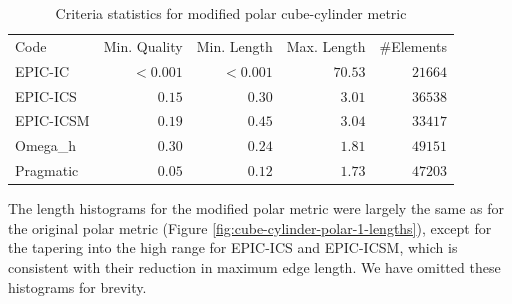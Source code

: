 \documentclass[3p,times,procedia,number]{elsarticle}
\begin{document}
\begin{table}
\caption{Criteria statistics for modified polar cube-cylinder metric}
\label{tab:polar-2-stats}
\begin{tabular}{lrrrr}
Code & Min. Quality & Min. Length & Max. Length & \#Elements\\
EPIC-IC    &$<0.001$&     $<0.001$&      $70.53$&    $21664$\\
EPIC-ICS   &$  0.15$&     $  0.30$&      $ 3.01$&    $36538$\\
EPIC-ICSM  &$  0.19$&     $  0.45$&      $ 3.04$&    $33417$\\
Omega\_h   &$  0.30$&     $  0.24$&      $ 1.81$&    $49151$\\
Pragmatic  &$  0.05$&     $  0.12$&      $ 1.73$&    $47203$\\
\end{tabular}
\end{table}

The length histograms for the modified polar metric were largely the
same as for the original polar metric
(Figure \ref{fig:cube-cylinder-polar-1-lengths}),
except for the tapering into the high range for EPIC-ICS and EPIC-ICSM,
which is consistent with their reduction in maximum edge length.
We have omitted these histograms for brevity.

\end{document}
